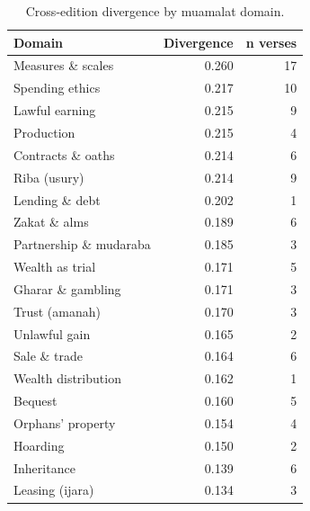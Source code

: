 \begin{table}[!h]
\centering
\caption{Cross-edition divergence by muamalat domain.}
\centering
\begin{tabular}[t]{lrr}
\toprule
Domain & Divergence & n verses\\
\midrule
Measures \& scales & 0.260 & 17\\
Spending ethics & 0.217 & 10\\
Lawful earning & 0.215 & 9\\
Production & 0.215 & 4\\
Contracts \& oaths & 0.214 & 6\\
\addlinespace
Riba (usury) & 0.214 & 9\\
Lending \& debt & 0.202 & 1\\
Zakat \& alms & 0.189 & 6\\
Partnership \& mudaraba & 0.185 & 3\\
Wealth as trial & 0.171 & 5\\
\addlinespace
Gharar \& gambling & 0.171 & 3\\
Trust (amanah) & 0.170 & 3\\
Unlawful gain & 0.165 & 2\\
Sale \& trade & 0.164 & 6\\
Wealth distribution & 0.162 & 1\\
\addlinespace
Bequest & 0.160 & 5\\
Orphans' property & 0.154 & 4\\
Hoarding & 0.150 & 2\\
Inheritance & 0.139 & 6\\
Leasing (ijara) & 0.134 & 3\\
\bottomrule
\end{tabular}
\end{table}
